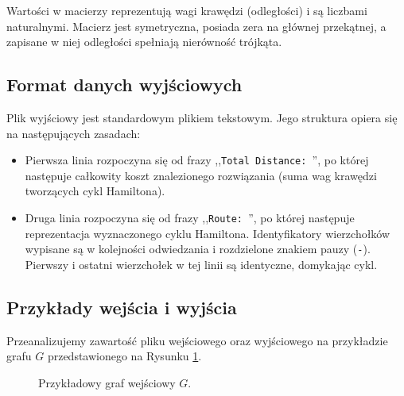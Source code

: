 \documentclass{article}
\theoremstyle{definition}
\theoremstyle{plain}
\theoremstyle{remark}
\begin{document}
\noindent
Wartości w macierzy reprezentują wagi krawędzi (odległości) i są liczbami naturalnymi. Macierz jest symetryczna, posiada zera na głównej przekątnej, a zapisane w niej odległości spełniają nierówność trójkąta.

\subsection{Format danych wyjściowych}

Plik wyjściowy jest standardowym plikiem tekstowym. Jego struktura opiera się na następujących zasadach:

\begin{itemize}
    \item Pierwsza linia rozpoczyna się od frazy ,,\texttt{Total Distance:\ }'', po której następuje całkowity koszt znalezionego rozwiązania (suma wag krawędzi tworzących cykl Hamiltona).
    \item Druga linia rozpoczyna się od frazy ,,\texttt{Route:\ }'', po której następuje reprezentacja wyznaczonego cyklu Hamiltona. Identyfikatory wierzchołków wypisane są w kolejności odwiedzania i rozdzielone znakiem pauzy (\texttt{-}). Pierwszy i ostatni wierzchołek w tej linii są identyczne, domykając cykl.
\end{itemize}

\subsection{Przykłady wejścia i wyjścia}

Przeanalizujemy zawartość pliku wejściowego oraz wyjściowego na przykładzie grafu $G$ przedstawionego na Rysunku \ref{rys:przyklad}. 

\begin{figure}[H]
    \centering
    \caption{Przykładowy graf wejściowy $G$.}
    \label{rys:przyklad}
\end{figure}
\end{document}
